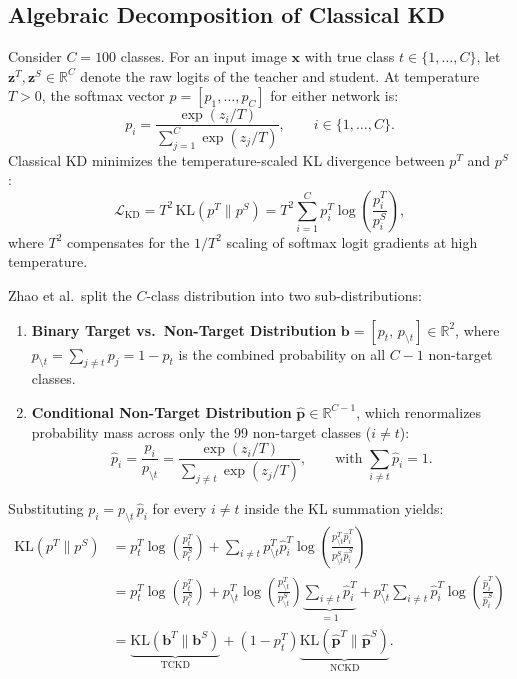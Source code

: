 \documentclass[11pt]{article}
\begin{document}
\subsection{Algebraic Decomposition of Classical KD}

Consider \(C = 100\) classes. For an input image \(\mathbf{x}\) with true class \(t \in \{1, \dots, C\}\), let \(\mathbf{z}^T, \mathbf{z}^S \in \mathbb{R}^C\) denote the raw logits of the teacher and student. At temperature \(T > 0\), the softmax vector \(p = [p_1, \dots, p_C]\) for either network is:
\begin{equation}
p_i = \frac{\exp(z_i / T)}{\sum_{j=1}^{C} \exp(z_j / T)}, \qquad i \in \{1, \dots, C\}.
\end{equation}
Classical KD minimizes the temperature-scaled KL divergence between \(p^T\) and \(p^S\):
\begin{equation}
\mathcal{L}_{\mathrm{KD}} = T^2 \, \mathrm{KL}(p^T \parallel p^S) = T^2 \sum_{i=1}^{C} p_i^T \log \left(\frac{p_i^T}{p_i^S}\right),
\end{equation}
where \(T^2\) compensates for the \(1/T^2\) scaling of softmax logit gradients at high temperature.

Zhao et al.\ split the \(C\)-class distribution into two sub-distributions:
\begin{enumerate}
    \item \textbf{Binary Target vs.\ Non-Target Distribution} \(\mathbf{b} = [p_t, \, p_{\setminus t}] \in \mathbb{R}^2\), where \(p_{\setminus t} = \sum_{j \neq t} p_j = 1 - p_t\) is the combined probability on all \(C-1\) non-target classes.
    \item \textbf{Conditional Non-Target Distribution} \(\hat{\mathbf{p}} \in \mathbb{R}^{C-1}\), which renormalizes probability mass across only the 99 non-target classes (\(i \neq t\)):
    \begin{equation}
    \hat{p}_i = \frac{p_i}{p_{\setminus t}} = \frac{\exp(z_i / T)}{\sum_{j \neq t} \exp(z_j / T)}, \qquad \text{with } \sum_{i \neq t} \hat{p}_i = 1.
    \end{equation}
\end{enumerate}

Substituting \(p_i = p_{\setminus t} \, \hat{p}_i\) for every \(i \neq t\) inside the KL summation yields:
\begin{align}
\mathrm{KL}(p^T \parallel p^S)
&= p_t^T \log\left(\frac{p_t^T}{p_t^S}\right) + \sum_{i \neq t} p_{\setminus t}^T \hat{p}_i^T \log\left(\frac{p_{\setminus t}^T \hat{p}_i^T}{p_{\setminus t}^S \hat{p}_i^S}\right) \nonumber \\
&= p_t^T \log\left(\frac{p_t^T}{p_t^S}\right) + p_{\setminus t}^T \log\left(\frac{p_{\setminus t}^T}{p_{\setminus t}^S}\right)\underbrace{\sum_{i \neq t} \hat{p}_i^T}_{= 1} + p_{\setminus t}^T \sum_{i \neq t} \hat{p}_i^T \log\left(\frac{\hat{p}_i^T}{\hat{p}_i^S}\right) \nonumber \\
&= \underbrace{\mathrm{KL}(\mathbf{b}^T \parallel \mathbf{b}^S)}_{\mathrm{TCKD}} + (1 - p_t^T)\underbrace{\mathrm{KL}(\hat{\mathbf{p}}^T \parallel \hat{\mathbf{p}}^S)}_{\mathrm{NCKD}}.
\label{eq:exact_kd}
\end{align}
\end{document}
